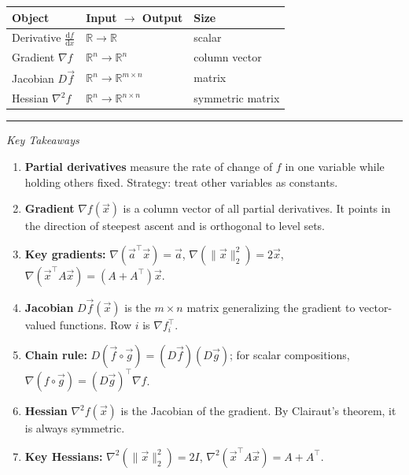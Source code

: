 \documentclass[10pt, twocolumn]{article}
\theoremstyle{definition}
\theoremstyle{plain}
\newcommand{\RR}{\mathbb{R}}
\begin{document}
\begin{center}
\small
\begin{tabular}{@{}lll@{}}
\toprule
\textbf{Object} & \textbf{Input $\to$ Output} & \textbf{Size} \\
\midrule
Derivative $\frac{\mathrm{d}f}{\mathrm{d}x}$ & $\RR \to \RR$ & scalar \\[4pt]
Gradient $\nabla f$ & $\RR^n \to \RR^n$ & column vector \\[4pt]
Jacobian $D\vec{f}$ & $\RR^n \to \RR^{m \times n}$ & matrix \\[4pt]
Hessian $\nabla^2 f$ & $\RR^n \to \RR^{n \times n}$ & symmetric matrix \\
\bottomrule
\end{tabular}
\end{center}


\vfill

\begin{center}
\rule{0.5\linewidth}{0.4pt}

\textit{Key Takeaways}
\end{center}

\begin{enumerate}
    \item \textbf{Partial derivatives} measure the rate of change of $f$ in one variable while holding others fixed. Strategy: treat other variables as constants.
    \item \textbf{Gradient} $\nabla f(\vec{x})$ is a column vector of all partial derivatives. It points in the direction of steepest ascent and is orthogonal to level sets.
    \item \textbf{Key gradients:} $\nabla(\vec{a}^\top \vec{x}) = \vec{a}$, \; $\nabla(\|\vec{x}\|_2^2) = 2\vec{x}$, \; $\nabla(\vec{x}^\top A \vec{x}) = (A + A^\top)\vec{x}$.
    \item \textbf{Jacobian} $D\vec{f}(\vec{x})$ is the $m \times n$ matrix generalizing the gradient to vector-valued functions. Row $i$ is $\nabla f_i^\top$.
    \item \textbf{Chain rule:} $D(\vec{f} \circ \vec{g}) = (D\vec{f})(D\vec{g})$; for scalar compositions, $\nabla(f \circ \vec{g}) = (D\vec{g})^\top \nabla f$.
    \item \textbf{Hessian} $\nabla^2 f(\vec{x})$ is the Jacobian of the gradient. By Clairaut's theorem, it is always symmetric.
    \item \textbf{Key Hessians:} $\nabla^2(\|\vec{x}\|_2^2) = 2I$, \; $\nabla^2(\vec{x}^\top A \vec{x}) = A + A^\top$.
\end{enumerate}
\end{document}
